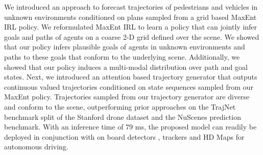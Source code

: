 \documentclass[journal]{IEEEtran}
\begin{document}
We introduced an approach to forecast trajectories of pedestrians and vehicles in unknown environments conditioned on plans sampled from a grid based MaxEnt IRL policy. We reformulated MaxEnt IRL to learn a policy that can jointly infer goals and paths of agents on a coarse 2-D grid defined over the scene. We showed that our policy infers plausible goals of agents in unknown environments and paths to these goals that conform to the underlying scene. Additionally, we showed that our policy induces a multi-modal distribution over path and goal states. Next, we introduced an attention based trajectory generator that outputs continuous valued trajectories conditioned on state sequences sampled from our MaxEnt policy. Trajectories sampled from our trajectory generator
are diverse and conform to the scene, outperforming prior approaches on the TrajNet benchmark split of the Stanford drone dataset and the NuScenes prediction benchmark. With an inference time of 79 ms, the proposed model can readily be deployed in conjunction with on board detectors \cite{rangesh2020ground}, trackers \cite{rangesh2019no, rangesh2021trackmpnn} and HD Maps for autonomous driving. 
\end{document}
